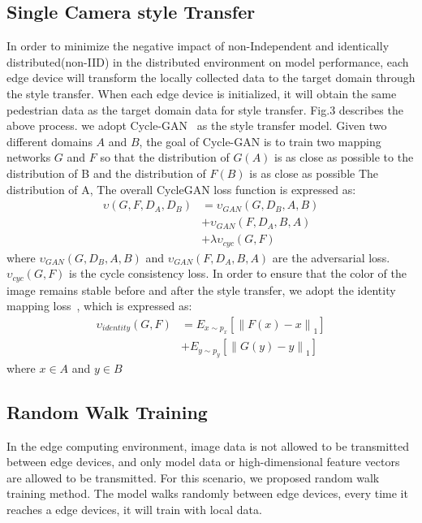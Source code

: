 \documentclass{article}
\begin{document}
\subsection{Single Camera style Transfer}
In order to minimize the negative impact of non-Independent and identically distributed(non-IID) in the distributed environment on model performance, each edge device will transform the locally collected data to the target domain through the style transfer. When each edge device is initialized, it will obtain the same pedestrian data as the target domain data for style transfer. Fig.3 describes the above process. we adopt Cycle-GAN~\cite{zhu2017unpaired} as the style transfer model. Given two different domains $A$ and $B$, the goal of Cycle-GAN is to train two mapping networks $G$ and $F$ so that the distribution of $G(A)$ is as close as possible to the distribution of B and the distribution of $F(B)$ is as close as possible The distribution of A, The overall CycleGAN loss function is expressed as:
\begin{equation}
\begin{aligned}
\upsilon (G,F,D_{A},D_{B})&=\upsilon_{GAN}(G,D_{B},A,B)\\
&+\upsilon_{GAN}(F,D_{A},B,A)\\
&+\lambda \upsilon_{cyc}(G,F)
\end{aligned}
\end{equation}
where $\upsilon_{GAN}(G,D_{B},A,B)$ and $\upsilon_{GAN}(F,D_{A},B,A)$ are the adversarial loss. $\upsilon_{cyc}(G,F)$ is the cycle consistency loss. In order to ensure that the color of the image remains stable before and after the style transfer, we adopt the identity mapping loss~\cite{zhu2017unpaired}, which is expressed as:
\begin{equation}
\begin{aligned}
    \upsilon_{identity}(G,F) & = E_{x\sim p_{x}} \left [ \left \| F(x) - x \right \|_{1} \right ]\\
    &+E_{y\sim p_{y}} \left [ \left \| G(y) - y \right \|_{1} \right ]
\end{aligned}
\end{equation}
where $x\in A$ and $y\in B$
\subsection{Random Walk Training}
In the edge computing environment, image data is not allowed to be transmitted between edge devices, and only model data or high-dimensional feature vectors are allowed to be transmitted. For this scenario, we proposed random walk training method. The model walks randomly between edge devices, every time it reaches a edge devices, it will train with local data.
\end{document}

